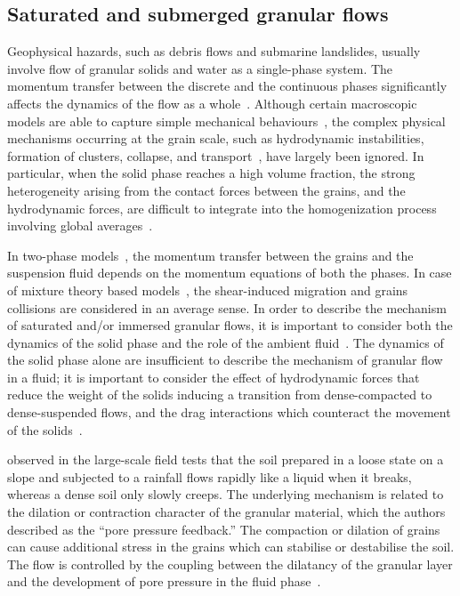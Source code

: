 \subsection{Saturated and submerged granular flows}
Geophysical hazards, such as debris flows and submarine landslides, usually 
involve flow of granular solids and water as a single-phase system. The 
momentum transfer between the discrete and the continuous phases significantly 
affects the dynamics of the flow as a whole~\citep{Topin2011}. Although certain 
macroscopic models are able to capture simple mechanical 
behaviours~\citep{Peker2007}, the complex physical mechanisms occurring at the 
grain scale, such as hydrodynamic instabilities, formation of clusters, 
collapse, and transport~\citep{Topin2011}, have largely been ignored. In 
particular, when the solid phase reaches a high volume fraction, the strong 
heterogeneity arising from the contact forces between the grains, and the 
hydrodynamic forces, are difficult to integrate into the homogenization process 
involving global averages~\citep{Topin2011}. 

In two-phase models~\citep{Pitman2005}, the momentum transfer between the 
grains and the suspension fluid depends on the momentum equations of both 
the phases. In case of mixture theory based models~\citep{Meruane2010}, the 
shear-induced migration 
and grains collisions are considered in an average sense. In order to 
describe the mechanism of saturated and/or immersed granular flows, it is 
important to consider both the dynamics of the solid phase and the role of the 
ambient fluid~\citep{Denlinger2001,Iverson1997}. The dynamics of the solid 
phase alone are insufficient to describe the mechanism of granular flow in a 
fluid; it is important to consider the effect of hydrodynamic forces that 
reduce the weight of the solids inducing a transition from dense-compacted to 
dense-suspended flows, and the drag interactions which counteract the movement 
of the solids~\citep{Meruane2010}.


\citet{Iverson2000} observed in the 
large-scale field tests that the soil prepared in a loose state on a slope and 
subjected to a rainfall flows rapidly like a liquid when it breaks, whereas a 
dense soil only slowly creeps. The underlying mechanism is related
to the dilation or contraction character of the granular material, which the 
authors described as the ``pore pressure feedback.'' The compaction or dilation 
of grains can cause additional stress in the grains which can stabilise or 
destabilise the soil. The flow is controlled by the coupling between the 
dilatancy of the granular layer and the development of pore pressure in the 
fluid phase~\citep{Pailha2008}.

